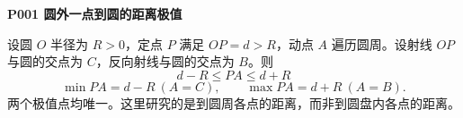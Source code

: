 \begin{statementbox}
\textbf{P001 圆外一点到圆的距离极值}

设圆 $O$ 半径为 $R>0$，定点 $P$ 满足 $OP=d>R$，动点 $A$ 遍历圆周。设射线 $OP$ 与圆的交点为 $C$，反向射线与圆的交点为 $B$。则
\[\boxed{d-R\leqslant PA\leqslant d+R}\]
\[\min PA=d-R\ (A=C),\qquad\max PA=d+R\ (A=B).\]
两个极值点均唯一。这里研究的是到圆周各点的距离，而非到圆盘内各点的距离。\begin{center}

\end{center}
\end{statementbox}
